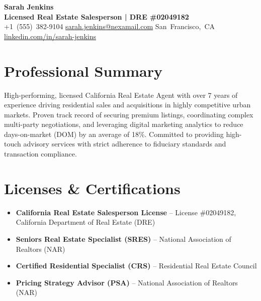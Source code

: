 \documentclass[10pt,oneside]{article}
\newcommand{\contactitem}[2]{\mbox{\textcolor{primary}{#1}\hspace{0.4em}#2}}
\begin{document}
\color{darktext}

\begin{center}
    {\Huge\bfseries\color{primary} Sarah Jenkins} \\[0.3em]
    {\large\bfseries\color{mutedgray} Licensed Real Estate Salesperson | DRE \#02049182} \\[0.6em]
    \contactitem{\faPhone}{+1 (555) 382-9104} \hspace{1.5em}
    \contactitem{\faEnvelope}{\href{mailto:sarah.jenkins@nexamail.com}{sarah.jenkins@nexamail.com}} \hspace{1.5em}
    \contactitem{\faMapMarker}{\mbox{San Francisco, CA}} \hspace{1.5em}
    \contactitem{\faLinkedin}{\href{https://linkedin.com/in/fictional-sarah-jenkins}{linkedin.com/in/sarah-jenkins}}
\end{center}

\vspace{0.4em}

\section*{Professional Summary}
High-performing, licensed California Real Estate Agent with over 7 years of experience driving residential sales and acquisitions in highly competitive urban markets. Proven track record of securing premium listings, coordinating complex multi-party negotiations, and leveraging digital marketing analytics to reduce days-on-market (DOM) by an average of 18\%. Committed to providing high-touch advisory services with strict adherence to fiduciary standards and transaction compliance.

\section*{Licenses \& Certifications}
\begin{itemize}[leftmargin=1.5em, itemsep=2pt, parsep=0pt, topsep=1pt]
    \item \textbf{California Real Estate Salesperson License} -- License \#02049182, California Department of Real Estate (DRE)
    \item \textbf{Seniors Real Estate Specialist (SRES)} -- National Association of Realtors (NAR)
    \item \textbf{Certified Residential Specialist (CRS)} -- Residential Real Estate Council
    \item \textbf{Pricing Strategy Advisor (PSA)} -- National Association of Realtors (NAR)
\end{itemize}
\end{document}
